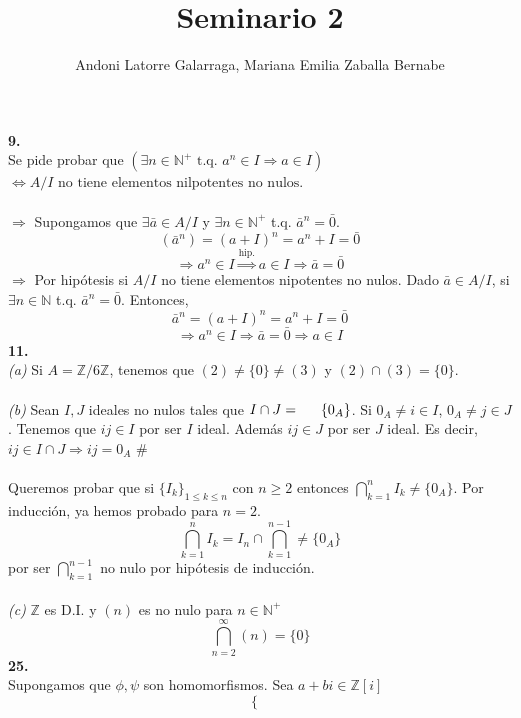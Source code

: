 \documentclass{article}
\title{Seminario 2}
\author{Andoni Latorre Galarraga, Mariana Emilia Zaballa Bernabe}
\date{}
\newcommand{\bb}[1]{\mathbb{#1}}
\begin{document}
\maketitle
\begin{multicols}{2}


\noindent \textbf{9.}\\
\indent Se pide probar que $\left( \exists n \in \mathbb{N}^+ \text{ t.q. } a^n\in I \Rightarrow a \in I \right)$ \indent $\Leftrightarrow A/I \text{ no tiene elementos nilpotentes no nulos}$.\\\\
\indent \indent $\boxed{\Rightarrow}$ Supongamos que $\exists \bar{a}\in A/I$ y $\exists n \in \bb{N}^+$ \indent \indent t.q. $\bar{a}^n=\bar{0}$.
$$
(\bar{a}^n) = (a+I)^n = a^n+I = \bar{0}
$$
$$
\Rightarrow a^n \in I \overset{\text{hip.}}{\Rightarrow} a \in I \Rightarrow \bar{a}=\bar{0}
$$
\indent \indent $\boxed{\Rightarrow}$ Por hipótesis si $A/I$ no tiene elementos \indent \indent nipotentes no nulos. Dado $\bar{a} \in A/I$, si $\exists n \in \bb{N}$ \indent \indent t.q. $\bar{a}^n = \bar{0}$. Entonces,
$$
\bar{a}^n = (a + I)^n = a^n + I = \bar{0}
$$
$$
\Rightarrow a^n \in I \Rightarrow \bar{a} = \bar{0} \Rightarrow a \in I
$$
\textbf{11.}\\
\indent \textit{(a)} Si $A = \bb{Z}/6\bb{Z}$, tenemos que $(2)\ne \{0\} \ne (3)$ y \indent $(2)\cap (3) = \{0\}$.\\\\
\indent \textit{(b)} Sean $I, J$ ideales no nulos tales que $I\cap J = \indent \{ 0_A\}$. Si $0_A\ne i\in I$, $0_A\ne j\in J$. Tenemos que \indent $ij \in I$ por ser $I$ ideal. Además $ij \in J$ por ser $J$ \indent ideal. Es decir, $ij \in I \cap J \Rightarrow ij=0_A$ \#\\\\
\indent Queremos probar que si $\{I_k\}_{1\le k \le n}$ con $n \ge 2$ \indent entonces $\bigcap_{k=1}^n I_k \ne \{0_A\}$. Por inducción, ya \indent hemos probado para $n=2$.
$$
\bigcap_{k=1}^n I_k = I_n \cap \bigcap_{k=1}^{n-1} \ne \{0_A\}
$$
\indent por ser $\bigcap_{k=1}^{n-1}$ no nulo por hipótesis de inducción.\\\\
\indent \textit{(c)} $\bb{Z}$ es D.I. y $(n)$ es no nulo para $n\in \bb{N}^+$
$$
\bigcap_{n=2}^\infty (n) = \{0\}
$$
\textbf{25.}\\
\indent Supongamos que $\phi, \psi$ son homomorfismos. Sea \indent $a+bi\in \bb{Z}[i]$
$$
\left\{\begin{array}{cc}

\end{array}$$
\end{multicols}
\end{document}
